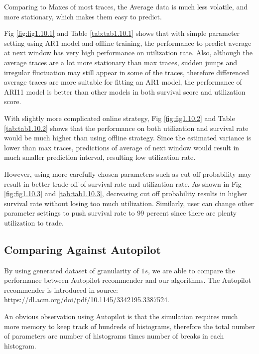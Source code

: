\documentclass{article}
\begin{document}
\begin{flushleft}
Comparing to Maxes of most traces, the Average data is much less volatile, and more stationary, which makes them easy to predict.

Fig \ref{fig:fig1.10.1} and Table \ref{tab:tab1.10.1} shows that with simple parameter setting using AR1 model and offline training, the performance to predict average at next window has very high performance on utilization rate. Also, although the average traces are a lot more stationary than max traces, sudden jumps and irregular fluctuation may still appear in some of the traces, therefore differenced average traces are more suitable for fitting an AR1 model, the performance of ARI11 model is better than other models in both survival score and utilization score.

With slightly more complicated online strategy, Fig \ref{fig:fig1.10.2} and Table \ref{tab:tab1.10.2} shows that the performance on both utilization and survival rate would be much higher than using offline strategy. Since the estimated variance is lower than max traces, predictions of average of next window would result in much smaller prediction interval, resulting low utilization rate.

However, using more carefully chosen parameters such as cut-off probability may result in better trade-off of survival rate and utilization rate. As shown in Fig \ref{fig:fig1.10.3} and \ref{tab:tab1.10.3}, decreasing cut off probability results in higher survival rate without losing too much utilization. Similarly, user can change other parameter settings to push survival rate to 99 percent since there are plenty utilization to trade.
\end{flushleft}

\subsection{Comparing Against Autopilot}

\begin{flushleft}
By using generated dataset of granularity of $1s$, we are able to compare the performance between Autopilot recommender and our algorithms. The Autopilot recommender is introduced in source: https://dl.acm.org/doi/pdf/10.1145/3342195.3387524.

An obvious observation using Autopilot is that the simulation requires much more memory to keep track of hundreds of histograms, therefore the total number of parameters are number of histograms times number of breaks in each histogram.
\end{flushleft}
\end{document}
